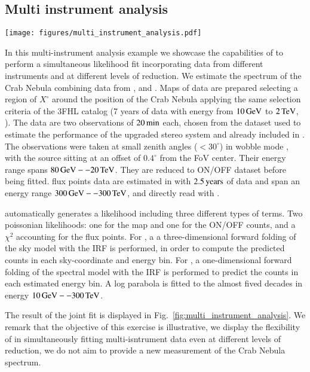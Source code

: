 \subsection{Multi instrument analysis}
\label{ssec:multi-instrument-analysis}

\begin{figure*}[t]
	\sidecaption
	\texttt{[image: figures/multi\_instrument\_analysis.pdf]}
	\caption{A multi-instrument analysis of the Crab Nebula}
	\label{fig:multi_instrument_analysis}
\end{figure*}


In this multi-instrument analysis example we showcase the capabilities of \gammapy
to perform a simultaneous likelihood fit incorporating data from different instruments
and at different levels of reduction.
We estimate the spectrum of the Crab Nebula combining data from \fermi, \magic and \hawc.
Maps of \fermi data are prepared selecting a region of $X^{\circ}$ around the
position of the Crab Nebula applying the same selection criteria of the 3FHL
catalog (7 years of data with energy from $10\,{\rm GeV}$ to $2\,{\rm TeV}$, \citealt{3FHL}).
The \magic data are two observations of $20\,{\rm min}$ each, chosen from the
dataset used to estimate the performance of the upgraded stereo system \citep{magic_performance}
and already included in \cite{joint_crab}. The observations were taken at small
zenith angles ($<30^{\circ}$) in wobble mode \citep{fomin_1994}, with the source
sitting at an offset of $0.4^{\circ}$ from the FoV center. Their energy range spans
$80\,{\rm GeV} -- 20\,{\rm TeV}$. They are reduced to ON/OFF dataset before being fitted.
\hawc flux points data are estimated in \cite{hawc_crab_2019} with $2.5\,{\rm years}$
of data and span an energy range $300\,{\rm GeV} -- 300\,{\rm TeV}$, and directly read with \gammapy.

\gammapy automatically generates a likelihood including three different types of
terms. Two poissonian likelihoods: one for the \fermi map and one for the ON/OFF
counts, and a $\chi^2$ accounting for the flux points. For \fermi, a
a three-dimensional forward folding of the sky model with the IRF is performed,
in order to compute the predicted counts in each sky-coordinate and energy bin.
For \magic, a one-dimensional forward folding of the spectral model with the IRF
is performed to predict the counts in each estimated energy bin.
A log parabola is fitted to the almost fived decades in energy $10\,{\rm GeV} -- 300\,{\rm TeV}$.

The result of the joint fit is displayed in Fig.~\ref{fig:multi_instrument_analysis}.
We remark that the objective of this exercise is illustrative, we display the
flexibility of \gammapy in simultaneously fitting multi-isntrument data even at
different levels of reduction, we do not aim to provide a new measurement of the
Crab Nebula spectrum.

